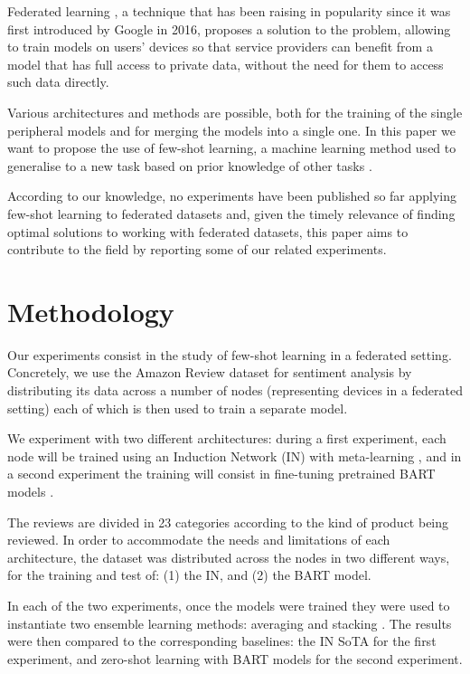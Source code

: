 \documentclass{esannV2}
\begin{document}
Federated learning \cite{mcmahan2017communication}, a technique that has been raising in popularity since it was first introduced by Google in 2016, proposes a solution to the problem, allowing to train models on users' devices so that service providers can benefit from a model that has full access to private data, without the need for them to access such data directly.

Various architectures and methods are possible, both for the training of the single peripheral models and for merging the models into a single one. In this paper we want to propose the use of few-shot learning, a machine learning method used to generalise to a new task based on prior knowledge of other tasks \cite{wang2020generalizing}.

According to our knowledge, no experiments have been published so far applying few-shot learning to federated datasets and, given the timely relevance of finding optimal solutions to working with federated datasets, this paper aims to contribute to the field by reporting some of our related experiments.




\section{Methodology}
Our experiments consist in the study of few-shot learning in a federated setting. Concretely, we use the Amazon Review dataset \cite{yu2018diverse} for sentiment analysis by distributing its data across a number of nodes (representing devices in a federated setting) each of which is then used to train a separate model.

We experiment with two different architectures: during a first experiment, each node will be trained using an Induction Network (IN) with meta-learning \cite{geng2019induction}, and in a second experiment the training will consist in fine-tuning pretrained BART models \cite{lewis2019bart}.

The reviews are divided in 23 categories according to the kind of product being reviewed. In order to accommodate the needs and limitations of each architecture, the dataset was distributed across the nodes in two different ways, for the training and test of: (1) the IN, and (2) the BART model. 

In each of the two experiments, once the models were trained they were used to instantiate two ensemble learning methods: averaging \cite{fedavg} and stacking \cite{wolpert}. The results were then compared to the corresponding baselines: the IN SoTA for the first experiment, and zero-shot \cite{zero} learning with BART models for the second experiment. 
\end{document}
